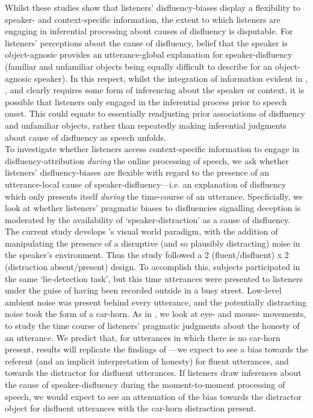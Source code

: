 \documentclass[a4paper,man,natbib]{apa6}
\begin{document}
Whilst these studies show that listeners' disfluency-biases display a flexibility to speaker- and context-specific information, the extent to which listeners are engaging in inferential processing about causes of disfluency is disputable. 
For listeners' perceptions about the cause of disfluency, belief that the speaker is object-agnosic provides an utterance-global explanation for speaker-disfluency (familiar and unfamiliar objects being equally difficult to describe for an object-agnosic speaker). 
In this respect, whilst the integration of information evident in \citet{Arnold2007}, \citet{Barr2010}, and \citet{Heller2015} clearly requires some form of inferencing about the speaker or context, it is possible that listeners only engaged in the inferential process prior to speech onset. 
This could equate to essentially readjusting prior associations of disfluency and unfamiliar objects, rather than repeatedly making inferential judgments about cause of disfluency as speech unfolds.\\

To investigate whether listeners access context-specific information to engage in disfluency-attribution \textit{during} the online processing of speech, we ask whether listeners' disfluency-biases are flexible with regard to the presence of an utterance-local cause of speaker-disfluency---i.e. an explanation of disfluency which only presents itself \textit{during} the time-course of an utterance. 
Specficially, we look at whether listeners' pragmatic biases to disfluencies signalling deception \citep{Loy2016} is moderated by the availability of `speaker-distraction' as a cause of disfluency.\\

The current study develops \citet{Loy2016}'s visual world paradigm, with the addition of manipulating the presence of a disruptive (and so plausibly distracting) noise in the speaker's environment.
Thus the study followed a 2 (fluent/disfluent) x 2 (distraction absent/present) design.
To accomplish this, subjects participated in the same `lie-detection task', but this time utterances were presented to listeners under the guise of having been recorded outside in a busy street.
Low-level ambient noise was present behind every utterance, and the potentially distracting noise took the form of a car-horn. 
As in \citet{Loy2016}, we look at eye- and mouse- movements, to study the time course of listeners' pragmatic judgments about the honesty of an utterance. 
We predict that, for utterances in which there is no car-horn present, results will replicate the findings of \citet{Loy2016}---we expect to see a bias towards the referent (and an implicit interpretation of honesty) for fluent utterances, and towards the distractor for disfluent utterances. 
If listeners draw inferences about the cause of speaker-disfluency during the moment-to-moment processing of speech, we would expect to see an attenuation of the bias towards the distractor object for disfluent utterances with the car-horn distraction present.\\
\end{document}
